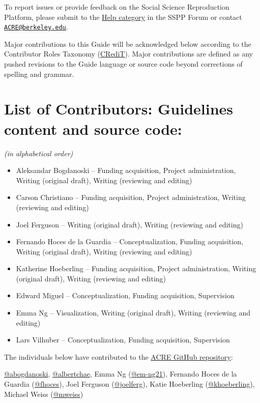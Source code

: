 \documentclass[
]{book}
\providecommand{\tightlist}{%
  \setlength{\itemsep}{0pt}\setlength{\parskip}{0pt}}
\begin{document}
To report issues or provide feedback on the Social Science Reproduction Platform, please submit to the \href{https://forum.socialsciencereproduction.org/c/help/8}{Help category} in the SSPP Forum or contact \href{mailto:ACRE@berkeley.edu}{\nolinkurl{ACRE@berkeley.edu}}.

Major contributions to this Guide will be acknowledged below according to the Contributor Roles Taxonomy (\href{https://casrai.org/credit/}{CRediT}). Major contributions are defined as any pushed revisions to the Guide language or source code beyond corrections of spelling and grammar.

\hypertarget{list-of-contributors-guidelines-content-and-source-code}{%
\section{List of Contributors: Guidelines content and source code:}\label{list-of-contributors-guidelines-content-and-source-code}}

\emph{(in alphabetical order)}

\begin{itemize}
\tightlist
\item
  Aleksandar Bogdanoski -- Funding acquisition, Project administration, Writing (original draft), Writing (reviewing and editing)
\item
  Carson Christiano -- Funding acquisition, Project administration, Writing (reviewing and editing)
\item
  Joel Ferguson -- Writing (original draft), Writing (reviewing and editing)
\item
  Fernando Hoces de la Guardia -- Conceptualization, Funding acquisition, Writing (original draft), Writing (reviewing and editing)
\item
  Katherine Hoeberling -- Funding acquisition, Project administration, Writing (original draft), Writing (reviewing and editing)
\item
  Edward Miguel -- Conceptualization, Funding acquisition, Supervision
\item
  Emma Ng -- Visualization, Writing (original draft), Writing (reviewing and editing)
\item
  Lars Vilhuber -- Conceptualization, Funding acquisition, Supervision
\end{itemize}

The individuals below have contributed to the \href{https://github.com/BITSS/ACRE}{ACRE GitHub repository}:

\href{https://github.com/abogdanoski}{@abogdanoski}, \href{https://github.com/albertchae}{@albertchae}, Emma Ng (\href{https://github.com/em-ng21}{@em-ng21}), Fernando Hoces de la Guardia (\href{https://github.com/fhoces}{@fhoces}), Joel Ferguson (\href{https://github.com/joelferg}{@joelferg}), Katie Hoeberling (\href{https://github.com/khoeberling}{@khoeberling}), Michael Weiss (\href{https://github.com/mweiss}{@mweiss})
\end{document}
